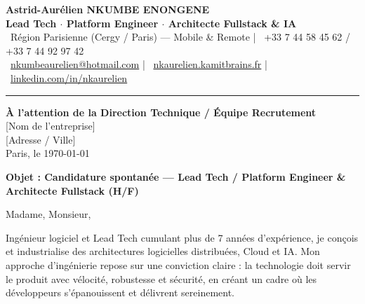 \documentclass[10pt,a4paper]{article}
\begin{document}
{\LARGE \textbf{\color{primary}Astrid-Aurélien NKUMBE ENONGENE}}\\[0.15em]
{\large \textbf{\color{darkgray}Lead Tech $\cdot$ Platform Engineer $\cdot$ Architecte Fullstack \& IA}}\\[0.35em]
{\small \color{lightgray}
\faMapMarker*\ Région Parisienne (Cergy / Paris) --- Mobile \& Remote \quad|\quad
\faPhone*\ +33 7 44 58 45 62 / +33 7 44 92 97 42\\[0.15em]
\faEnvelope\ \href{mailto:nkumbeaurelien@hotmail.com}{nkumbeaurelien@hotmail.com} \quad|\quad
\faGlobe\ \href{https://nkaurelien.kamitbrains.fr}{nkaurelien.kamitbrains.fr} \quad|\quad
\faLinkedin\ \href{https://www.linkedin.com/in/nkaurelien/}{linkedin.com/in/nkaurelien}
}

\vspace{0.3em}
\textcolor{rulecolor}{\rule{\linewidth}{1pt}}
\vspace{0.5em}

\begin{flushright}
    \textbf{À l’attention de la Direction Technique / Équipe Recrutement}\\[0.15em]
    [Nom de l’entreprise]\\[0.15em]
    [Adresse / Ville]\\[0.4em]
    {\small \color{lightgray} Paris, le \today}
\end{flushright}

\vspace{0.3em}

\textbf{\color{primary}Objet : Candidature spontanée --- Lead Tech / Platform Engineer \& Architecte Fullstack (H/F)}

\vspace{0.4em}

Madame, Monsieur,

Ingénieur logiciel et Lead Tech cumulant plus de 7 années d’expérience, je conçois et industrialise des architectures logicielles distribuées, Cloud et IA. Mon approche d'ingénierie repose sur une conviction claire : la technologie doit servir le produit avec vélocité, robustesse et sécurité, en créant un cadre où les développeurs s'épanouissent et délivrent sereinement.
\end{document}
